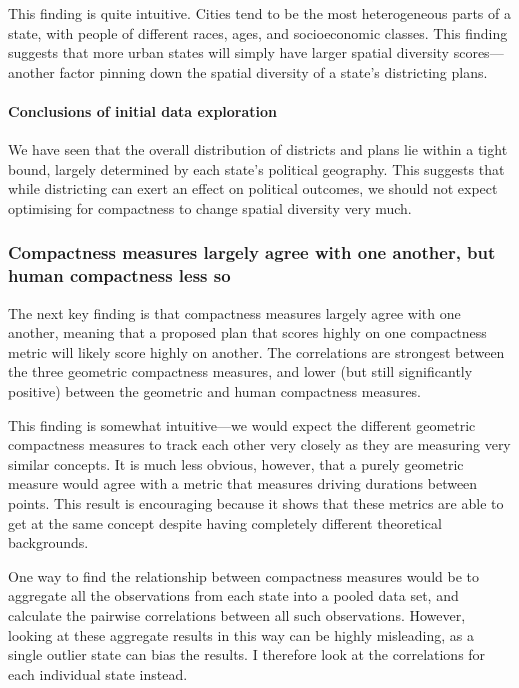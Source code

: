 \documentclass[]{article}
\let\oldparagraph\paragraph
\renewcommand{\paragraph}[1]{\oldparagraph{#1}\mbox{}}
\begin{document}
This finding is quite intuitive. Cities tend to be the most
heterogeneous parts of a state, with people of different races, ages,
and socioeconomic classes. This finding suggests that more urban states
will simply have larger spatial diversity scores---another factor
pinning down the spatial diversity of a state's districting plans.

\hypertarget{conclusions-of-initial-data-exploration}{%
\paragraph{Conclusions of initial data
exploration}\label{conclusions-of-initial-data-exploration}}

We have seen that the overall distribution of districts and plans lie
within a tight bound, largely determined by each state's political
geography. This suggests that while districting can exert an effect on
political outcomes, we should not expect optimising for compactness to
change spatial diversity very much.

\hypertarget{compactness-measures-largely-agree-with-one-another-but-human-compactness-less-so}{%
\subsubsection{Compactness measures largely agree with one another, but
human compactness less
so}\label{compactness-measures-largely-agree-with-one-another-but-human-compactness-less-so}}

The next key finding is that compactness measures largely agree with one
another, meaning that a proposed plan that scores highly on one
compactness metric will likely score highly on another. The correlations
are strongest between the three geometric compactness measures, and
lower (but still significantly positive) between the geometric and human
compactness measures.

This finding is somewhat intuitive---we would expect the different
geometric compactness measures to track each other very closely as they
are measuring very similar concepts. It is much less obvious, however,
that a purely geometric measure would agree with a metric that measures
driving durations between points. This result is encouraging because it
shows that these metrics are able to get at the same concept despite
having completely different theoretical backgrounds.

One way to find the relationship between compactness measures would be
to aggregate all the observations from each state into a pooled data
set, and calculate the pairwise correlations between all such
observations. However, looking at these aggregate results in this way
can be highly misleading, as a single outlier state can bias the
results. I therefore look at the correlations for each individual state
instead.
\end{document}
